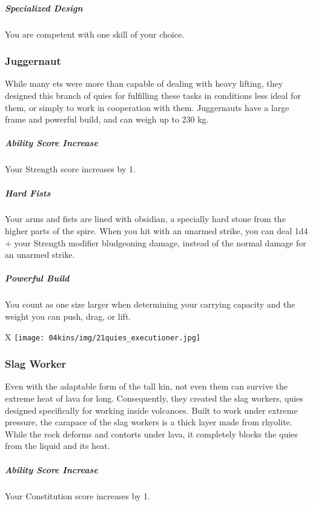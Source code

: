     \subparagraph{Specialized Design} You are competent with one skill of your choice.

\subsubsection{Juggernaut}
    While many ets were more than capable of dealing with heavy lifting, they designed this branch of quies for fulfilling these tasks in conditions less ideal for them, or simply to work in cooperation with them.
    Juggernauts have a large frame and powerful build, and can weigh up to 230 kg.

    \subparagraph{Ability Score Increase} Your Strength score increases by 1.

    \subparagraph{Hard Fists} Your arms and fists are lined with obsidian, a specially hard stone from the higher parts of the spire.
    When you hit with an unarmed strike, you can deal 1d4 + your Strength modifier bludgeoning damage, instead of the normal damage for an unarmed strike.

    \subparagraph{Powerful Build} You count as one size larger when determining your carrying capacity and the weight you can push, drag, or lift.

\begin{table*}[b]%
    \begin{DndTable}[width=\linewidth]{X}
        \texttt{[image: 04kins/img/21quies\_executioner.jpg]}
    \end{DndTable}
\end{table*}

\subsubsection{Slag Worker}
    Even with the adaptable form of the tall kin, not even them can survive the extreme heat of lava for long.
    Consequently, they created the slag workers, quies designed specifically for working inside volcanoes.
    Built to work under extreme pressure, the carapace of the slag workers is a thick layer made from rhyolite.
    While the rock deforms and contorts under lava, it completely blocks the quies from the liquid and its heat.

    \subparagraph{Ability Score Increase} Your Constitution score increases by 1.

